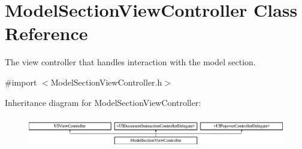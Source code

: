 \hypertarget{interface_model_section_view_controller}{\section{Model\-Section\-View\-Controller Class Reference}
\label{interface_model_section_view_controller}
}


The view controller that handles interaction with the model section.  




{\ttfamily \#import $<$Model\-Section\-View\-Controller.\-h$>$}

Inheritance diagram for Model\-Section\-View\-Controller\-:\begin{figure}[H]
\begin{center}
\leavevmode
\includegraphics[height=1.403509cm]{interface_model_section_view_controller}
\end{center}
\end{figure}
